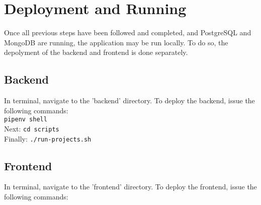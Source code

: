 \documentclass{article}
\newcommand{\code}[1]{\colorbox{light-gray}{\texttt{#1}}}
\begin{document}
\section{Deployment and Running}
Once all previous steps have been followed and completed, and PostgreSQL and MongoDB are running, the application may be run locally. To do so,
the depolyment of the backend and frontend is done separately.
\subsection{Backend}
In terminal, navigate to the 'backend' directory. To deploy the backend, issue the following commands:\\ \code{pipenv shell}
\\Next: \code{cd scripts}\\
Finally: \code{./run-projects.sh}\\

\subsection{Frontend}
In terminal, navigate to the 'frontend' directory. To deploy the frontend, issue the following commands:\\
\end{document}
